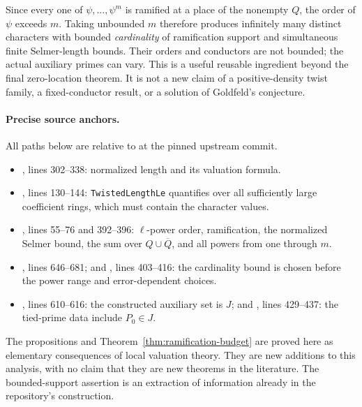 Since every one of $\psi,\ldots,\psi^m$ is ramified at a place of the
nonempty $Q$, the order of $\psi$ exceeds $m$. Taking unbounded $m$
therefore produces infinitely many distinct characters with bounded
\emph{cardinality} of ramification support and simultaneous finite
Selmer-length bounds. Their orders and conductors are not bounded;
the actual auxiliary primes can vary. This is a useful reusable
ingredient beyond the final zero-location theorem. It is not a new
claim of a positive-density twist family, a fixed-conductor result,
or a solution of Goldfeld's conjecture.

\paragraph{Precise source anchors.}
All paths below are relative to  at the pinned upstream commit.
\begin{itemize}
\item {},
      lines 302--338: normalized length and its valuation formula.
\item {}, lines 130--144:
      \texttt{TwistedLengthLe} quantifies over all sufficiently large
      coefficient rings, which must contain the character values.
\item {},
      lines 55--76 and 392--396: $\ell$-power order, ramification,
      the normalized Selmer bound, the sum over $Q\cup\overline Q$,
      and all powers from one through $m$.
\item {},
      lines 646--681; and
      ,
      lines 403--416: the cardinality bound is chosen before the
      power range and error-dependent choices.
\item {}, lines 610--616:
      the constructed auxiliary set is $J$; and
      ,
      lines 429--437: the tied-prime data include $P_0\in J$.
\end{itemize}

The propositions and Theorem~\ref{thm:ramification-budget} are proved
here as elementary consequences of local valuation theory. They are
new additions to this analysis, with no claim that they are new
theorems in the literature. The bounded-support assertion is an
extraction of information already in the repository's construction.
